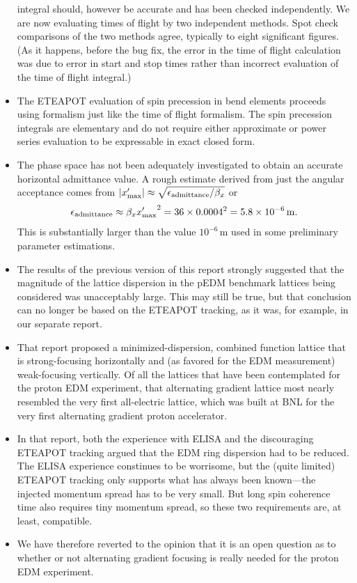 \documentclass[]{article}
\begin{document}
\begin{itemize}
integral should,
however be accurate and has been checked independently. 
We are now evaluating times of flight by two independent methods.
Spot check comparisons of the two methods agree, typically to
eight significant figures. (As it happens, before the bug fix, the 
error in the time of flight calculation was due to error in 
start and stop times rather than incorrect evaluation of the
time of flight integral.)
\item
The ETEAPOT evaluation of spin precession in bend elements proceeds
using formalism just like the time of flight formalism. The
spin precession integrals are elementary and do not require either 
approximate or power series evaluation to be expressable in 
exact closed form.  
\item
The phase space has not been adequately investigated to obtain
an accurate horizontal admittance value. A rough estimate 
derived from just the angular acceptance comes from
$|x'_{\rm max}|\approx\sqrt{\epsilon_{\rm admittance}/\beta_x}$ or 
%
\begin{equation}
\epsilon_{\rm admittance}
\approx
\beta_x{x'_{\rm max}}^2
 =
36\times0.0004^2
 =
5.8\times10^{-6}\,{\rm m}.
\label{eq:Comments.1} 
\end{equation}
%
This is substantially larger than the value $10^{-6}\,${\rm m} used
in some preliminary parameter estimations.
\item
The results of the previous version of this report strongly 
suggested that the magnitude of the lattice dispersion in the 
pEDM benchmark lattices being considered was unacceptably large. 
This may still be true, but that conclusion can no longer
be based on the ETEAPOT tracking, as it was, for example, in 
our separate report\cite{RTMinimumDispersion}.
\item
That report proposed a minimized-dispersion, combined function 
lattice that is strong-focusing horizontally and
(as favored for the EDM measurement) weak-focusing vertically.
Of all the lattices that have been contemplated for the proton
EDM experiment, that alternating gradient lattice most nearly 
resembled the very first all-electric lattice, which was built at 
BNL for the very first alternating gradient proton 
accelerator\cite{Plotkin}.
\item
In that report, both the experience with ELISA and the discouraging
ETEAPOT tracking argued that the EDM ring dispersion had to be 
reduced. The ELISA experience constinues to be worrisome, but the 
(quite limited) ETEAPOT tracking only supports what has
always been known---the injected momentum spread has to be very
small. But long spin coherence time also requires tiny momentum
spread, so these two requirements are, at least, compatible. 
\item
We have therefore reverted to the opinion that it is an open question 
as to whether or not alternating gradient focusing is really 
needed for the proton EDM experiment.
\end{itemize}
%
\end{document}
